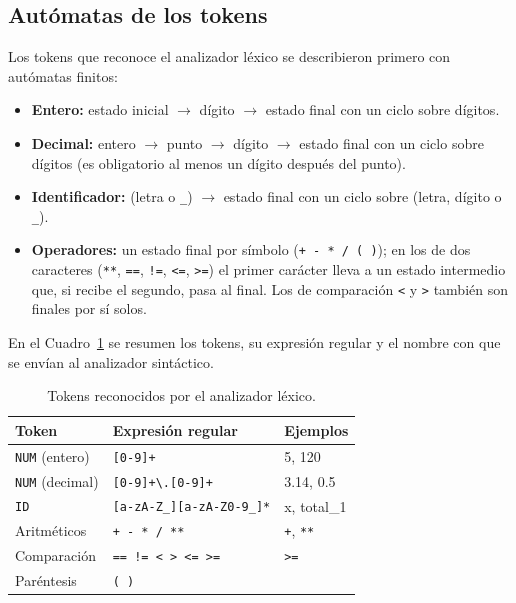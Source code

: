 \documentclass{article}
\begin{document}
    \subsection{Autómatas de los tokens}
    Los tokens que reconoce el analizador léxico se describieron primero con autómatas finitos:
    \begin{itemize}
        \item \textbf{Entero:} estado inicial $\to$ dígito $\to$ estado final con un ciclo sobre dígitos.
        \item \textbf{Decimal:} entero $\to$ punto $\to$ dígito $\to$ estado final con un ciclo sobre dígitos (es obligatorio al menos un dígito después del punto).
        \item \textbf{Identificador:} (letra o \texttt{\_}) $\to$ estado final con un ciclo sobre (letra, dígito o \texttt{\_}).
        \item \textbf{Operadores:} un estado final por símbolo (\texttt{+ - * / ( )}); en los de dos caracteres (\texttt{**}, \texttt{==}, \texttt{!=}, \texttt{<=}, \texttt{>=}) el primer carácter lleva a un estado intermedio que, si recibe el segundo, pasa al final. Los de comparación \texttt{<} y \texttt{>} también son finales por sí solos.
    \end{itemize}
    En el Cuadro~\ref{tab:tokens} se resumen los tokens, su expresión regular y el nombre con que se envían al analizador sintáctico.

    \begin{table}[H]
    \begin{center}
    \caption{Tokens reconocidos por el analizador léxico.}
    \label{tab:tokens}
    \begin{tabular}{|l|l|l|}
        \hline
        Token & Expresión regular & Ejemplos \\
        \hline
        \texttt{NUM} (entero) & \texttt{[0-9]+} & 5, 120 \\
        \hline
        \texttt{NUM} (decimal) & \texttt{[0-9]+\textbackslash.[0-9]+} & 3.14, 0.5 \\
        \hline
        \texttt{ID} & \texttt{[a-zA-Z\_][a-zA-Z0-9\_]*} & x, total\_1 \\
        \hline
        Aritméticos & \texttt{+ - * / **} & \texttt{+}, \texttt{**} \\
        \hline
        Comparación & \texttt{== != < > <= >=} & \texttt{>=} \\
        \hline
        Paréntesis & \texttt{( )} & \\
        \hline
    \end{tabular}
    \end{center}
    \end{table}
\end{document}

